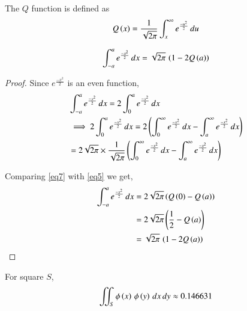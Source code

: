 \documentclass[journal,12pt,twocolumn]{IEEEtran}
\begin{document}
\begin{definition}
The $Q$ function is defined as
\begin{align}
    Q\left(x\right) = \frac{1}{\sqrt{2\pi}}\int_x^\infty e^{\frac{-u^2}{2}}\, du\label{eq5}
\end{align}
\end{definition}

\begin{lemma}
\begin{align}
    \int_{-a}^{a} e^{\frac{-x^2}{2}}\, dx = \sqrt{2\pi}\,\left(1-2Q\left(a\right)\right)\label{eq6}
\end{align}
\end{lemma}

\begin{proof}
Since $e^{\frac{-x^2}{2}}$ is an even function,
\begin{align}
    &\int_{-a}^{a} e^{\frac{-x^2}{2}}\, dx = 2\int_{0}^{a} e^{\frac{-x^2}{2}}\, dx\\
    &\implies 2\int_{0}^{a} e^{\frac{-x^2}{2}}\, dx = 2 \left(\int_{0}^{\infty} e^{\frac{-x^2}{2}}\, dx - \int_{a}^{\infty} e^{\frac{-x^2}{2}}\, dx\right) \nonumber\\
    &= 2\sqrt{2\pi} \times \frac{1}{\sqrt{2\pi}} \left(\int_{0}^{\infty} e^{\frac{-x^2}{2}}\, dx - \int_{a}^{\infty} e^{\frac{-x^2}{2}}\, dx\right) \label{eq7}
\end{align}

Comparing \eqref{eq7} with \eqref{eq5} we get,
\begin{align}
    \int_{-a}^{a} e^{\frac{-x^2}{2}}\, dx &= 2\sqrt{2\pi}\left(Q\left(0\right) - Q\left(a\right)\right)\\
    &= 2\sqrt{2\pi}\left(\frac{1}{2} - Q\left(a\right)\right)\\
    &= \sqrt{2\pi}\,\left(1 - 2Q\left(a\right)\right)
\end{align}
\end{proof}

\begin{lemma}
For square $S$,
\begin{align}
    \iint_S{\phi\left(x\right)\,\phi\left(y\right)\,dx\,dy} \approx 0.146631\label{eq10}
\end{align}
\end{lemma}
\end{document}
